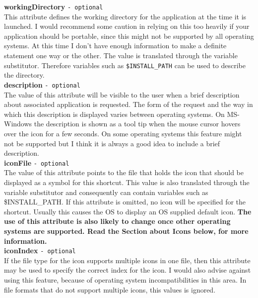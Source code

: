 \textbf{workingDirectory} \texttt{- optional}\\

This attribute defines the working directory for the application at the
time it is launched. I would recommend some caution in relying on this
too heavily if your application should be portable, since this might not
be supported by all operating systems. At this time I don't have enough
information to make a definite statement one way or the other. The value
is translated through the variable substitutor. Therefore variables such
as \texttt{\$INSTALL\_PATH} can be used to describe the directory.\\

\textbf{description} \texttt{- optional}\\

The value of this attribute will be visible to the user when a brief
description about associated application is requested. The form of the
request and the way in which this description is displayed varies
between operating systems. On MS-Windows the description is shown as a
tool tip when the mouse cursor hovers over the icon for a few seconds.
On some operating systems this feature might not be supported but I
think it is always a good idea to include a brief description.\\

\textbf{iconFile} \texttt{- optional}\\

The value of this attribute points to the file that holds the icon that
should be displayed as a symbol for this shortcut. This value is also
translated through the variable substitutor and consequently can contain
variables such as \$INSTALL\_PATH. If this attribute is omitted, no icon
will be specified for the shortcut. Usually this causes the OS to
display an OS supplied default icon. \textbf{The use of this attribute
is also likely to change once other operating systems are supported.
Read the Section about Icons below, for more information.}\\

\textbf{iconIndex} \texttt{- optional}\\

If the file type for the icon supports multiple icons in one file, then
this attribute may be used to specify the correct index for the icon. I
would also advise against using this feature, because of operating
system incompatibilities in this area. In file formats that do not
support multiple icons, this values is ignored.\\

